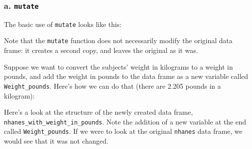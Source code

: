 \documentclass[]{article}
\newenvironment{Shaded}{\begin{snugshade}}{\end{snugshade}}
\newcommand{\KeywordTok}[1]{\textcolor[rgb]{0.13,0.29,0.53}{\textbf{#1}}}
\newcommand{\DataTypeTok}[1]{\textcolor[rgb]{0.13,0.29,0.53}{#1}}
\newcommand{\DecValTok}[1]{\textcolor[rgb]{0.00,0.00,0.81}{#1}}
\newcommand{\FloatTok}[1]{\textcolor[rgb]{0.00,0.00,0.81}{#1}}
\newcommand{\StringTok}[1]{\textcolor[rgb]{0.31,0.60,0.02}{#1}}
\newcommand{\OperatorTok}[1]{\textcolor[rgb]{0.81,0.36,0.00}{\textbf{#1}}}
\newcommand{\ErrorTok}[1]{\textcolor[rgb]{0.64,0.00,0.00}{\textbf{#1}}}
\newcommand{\NormalTok}[1]{#1}
\begin{document}
\subsubsection{\texorpdfstring{a.
\texttt{mutate}}{a. mutate}}\label{a.-mutate}

The basic use of \texttt{mutate} looks like this:

\begin{Shaded}
\end{Shaded}

Note that the \texttt{mutate} function does not necessarily modify the
original data frame: it creates a second copy, and leaves the original
as it was.

Suppose we want to convert the subjects' weight in kilograms to a weight
in pounds, and add the weight in pounds to the data frame as a new
variable called \texttt{Weight\_pounds}. Here's how we can do that
(there are 2.205 pounds in a kilogram):

\begin{Shaded}
\end{Shaded}

Here's a look at the structure of the newly created data frame,
\texttt{nhanes\_with\_weight\_in\_pounds}. Note the addition of a new
variable at the end called \texttt{Weight\_pounds}. If we were to look
at the original \texttt{nhanes} data frame, we would see that it was not
changed.
\end{document}
